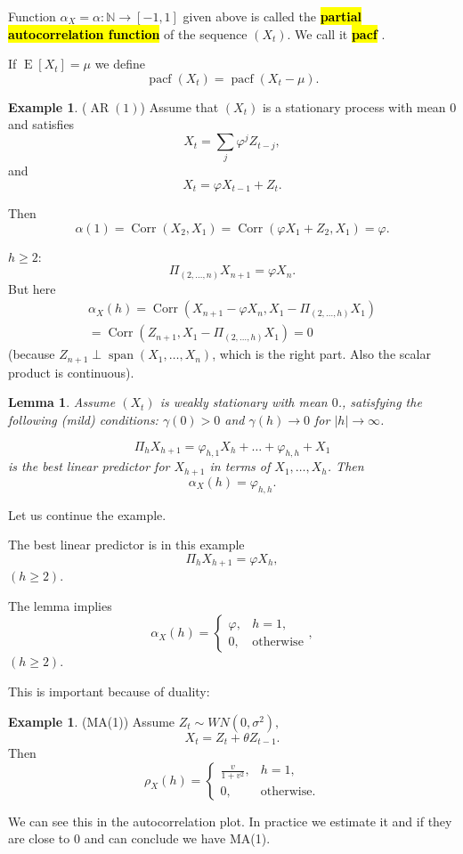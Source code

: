 \documentclass[12pt,a4paper, notitlepage]{book}
\newcommand{\hlc}[2][yellow]{ {\sethlcolor{#1} \hl{#2}} }
\newcommand{\hlcr}[1]{\hlc[lightred]{#1}}
\theoremstyle{definition} %
\newtheorem{example}[definition]{Example}
\theoremstyle{plain} %
\newtheorem{lemma}[definition]{Lemma}
\newcommand{\N}{\mathbb N}
\DeclareMathOperator{\E}{E}
\DeclareMathOperator{\Span}{span}
\DeclareMathOperator{\Corr}{Corr}
\DeclareMathOperator{\Pacf}{pacf}
\DeclareMathOperator{\Ar}{AR}
\newcommand{\New}[1]{ {\bf \hlcr{#1} } }
\begin{document}
Function $\alpha_X = \alpha: \N \rightarrow [-1,1]$ given above is called the \New{ partial autocorrelation function} of the sequence $(X_t)$. We call it \New{ pacf}.

If $\E[X_t ] = \mu$ we define 
\[ \Pacf(X_t) = \Pacf(X_t - \mu). \]

\begin{example} ($\Ar(1)$)
Assume that $(X_t)$ is a stationary process with mean $0$ and satisfies 
\[ X_t = \sum_j \varphi^j Z_{t-j} , \]
 and 
\[ X_t = \varphi X_{t-1} + Z_t. \]

Then 
\[ \alpha(1) = \Corr(X_2, X_1) = \Corr(\varphi X_1 + Z_2, X_1) = \varphi . \]

$h \geq 2$:
\[ \Pi_{(2,\dots,n)}X_{n+1} = \varphi X_n. \]
But here 
\begin{align*}  \alpha_X(h) = \Corr(X_{n+1} - \varphi X_n, X_1 - \Pi_{(2, \dots,h)}X_1)  \\ 
 =  \Corr(Z_{n+1}, X_1 - \Pi_{(2, \dots,h)}X_1) = 0 \end{align*}
  (because $Z_{n+1}  \perp \Span(X_1, \dots, X_n)$, which is the right part. Also the scalar product is continuous).


\begin{lemma}
Assume $(X_t)$ is weakly stationary with mean $0$., satisfying the following (mild) conditions: $\gamma(0) > 0$ and $\gamma(h) \rightarrow 0$ for $ |h| \rightarrow   \infty$. 

\[ \Pi_h X_{h+1} = \varphi_{h,1} X_h + \dots + \varphi_{h,h} + X_1\]
 is the best linear predictor for $X_{h+1}$ in terms of $X_1, \dots, X_h$. Then
\[ \alpha_X(h) = \varphi_{h,h}. \] 
\end{lemma}

Let us continue the example. 

The best linear predictor is in this example 
\[ \Pi_h X_{h+1} = \varphi X_h , \] $(h\geq 2)$.

The lemma 
implies 
\[ \alpha_X(h) =  \begin{cases} \varphi, & h =1 , \\  0 , & \text{otherwise} \end{cases} , \] $(h \geq 2)$.
\end{example}




This is important because of duality:

\begin{example} (MA(1))
Assume $Z_t \sim WN(0, \sigma^2),$ 
\[  X_t = Z_t + \theta Z_{t-1}. \]
Then 
\[ \rho_X(h) = \begin{cases} \frac{v}{1+v^2} , &   h = 1 , \\ 0 , & \text{otherwise} . \end{cases} \]

We can see this in the autocorrelation plot. In practice we estimate it and if they are close to $0$ and can conclude we have MA(1). 
\end{example}
\end{document}
